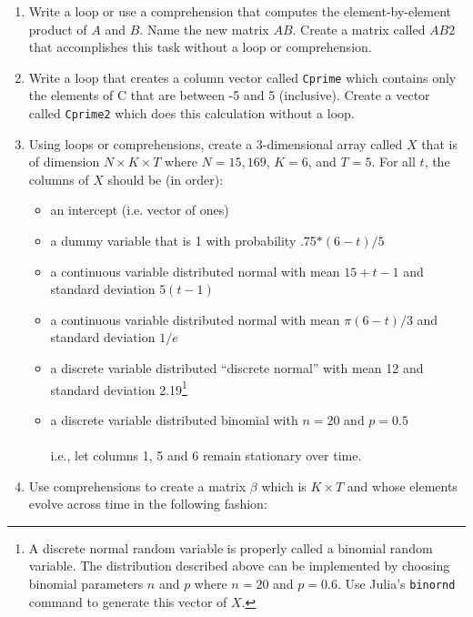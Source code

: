 \documentclass[12pt,english]{article}
\begin{document}
\begin{enumerate}
\begin{enumerate}
\item Write a loop or use a comprehension that computes the element-by-element product of $A$ and $B$. Name the new matrix $AB$. Create a matrix called $AB2$ that accomplishes this task without a loop or comprehension.
\item Write a loop that creates a column vector called \texttt{Cprime} which contains only the elements of C that are between -5 and 5 (inclusive). Create a vector called \texttt{Cprime2} which does this calculation without a loop.
\item Using loops or comprehensions, create a 3-dimensional array called $X$ that is of dimension $N\times K\times T$ where $N=15,169$, $K=6$, and $T=5$. For all $t$, the columns of $X$ should be (in order):

\begin{itemize}
\item an intercept (i.e. vector of ones)
\item a dummy variable that is 1 with probability .75$*\left(6-t\right)/5$
\item a continuous variable distributed normal with mean $15+t-1$ and standard deviation $5\left(t-1\right)$
\item a continuous variable distributed normal with mean $\pi\left(6-t\right)/3$ and standard deviation $1/e$
\item a discrete variable distributed ``discrete normal'' with mean 12 and standard deviation 2.19\footnote{A discrete normal random variable is properly called a binomial random variable. The distribution described above can be implemented by choosing binomial parameters $n$ and $p$ where $n=20$ and $p=0.6$. Use Julia's \texttt{binornd} command to generate this vector of $X$. }
\item a discrete variable distributed binomial with $n=20$ and $p=0.5$\\
\\
i.e., let columns 1, 5 and 6 remain stationary over time. 
\end{itemize}
\item Use comprehensions to create a matrix $\beta$ which is $K\times T$ and whose elements evolve across time in the following fashion:


\end{enumerate}
\end{enumerate}
\end{document}
